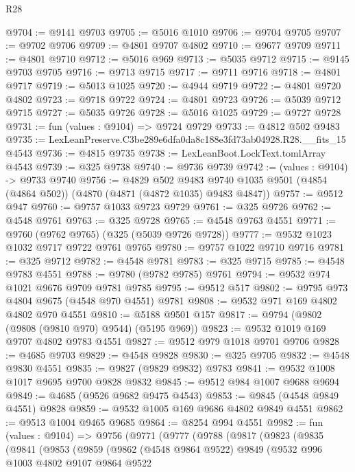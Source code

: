 \begin{lexlean}{R28}
\begin{coremodule}
@9704 := @9141 @9703
@9705 := @5016 @1010
@9706 := @9704 @9705
@9707 := @9702 @9706
@9709 := @4801 @9707 @4802
@9710 := @9677 @9709
@9711 := @4801 @9710
@9712 := @5016 @969
@9713 := @5035 @9712
@9715 := @9145 @9703 @9705
@9716 := @9713 @9715
@9717 := @9711 @9716
@9718 := @4801 @9717
@9719 := @5013 @1025
@9720 := @4944 @9719
@9722 := @4801 @9720 @4802
@9723 := @9718 @9722
@9724 := @4801 @9723
@9726 := @5039 @9712 @9715
@9727 := @5035 @9726
@9728 := @5016 @1025
@9729 := @9727 @9728
@9731 := fun (values : @9104) => @9724 @9729
@9733 := @4812 @502 @9483
@9735 := LexLeanPreserve.C3be289e6dfa0da8c188e3fd73ab04928.R28.__fits_15 @4543
@9736 := @4815 @9735
@9738 := LexLeanBoot.LockText.tomlArray @4543
@9739 := @325 @9738
@9740 := @9736 @9739
@9742 := (values : @9104) -> @9733 @9740
@9756 := @4829
    @502
    @9483
    @9740
    @1035
    @9501
    (@4854 (@4864 @502))
    (@4870 (@4871 (@4872 @1035) @9483 @4847))
@9757 := @9512 @947
@9760 := @9757 @1033 @9723 @9729
@9761 := @325 @9726
@9762 := @4548 @9761
@9763 := @325 @9728
@9765 := @4548 @9763 @4551
@9771 := @9760 (@9762 @9765) (@325 (@5039 @9726 @9728))
@9777 := @9532 @1023 @1032 @9717 @9722 @9761 @9765
@9780 := @9757 @1022 @9710 @9716
@9781 := @325 @9712
@9782 := @4548 @9781
@9783 := @325 @9715
@9785 := @4548 @9783 @4551
@9788 := @9780 (@9782 @9785) @9761
@9794 := @9532 @974 @1021 @9676 @9709 @9781 @9785
@9795 := @9512 @517
@9802 := @9795 @973 @4804 @9675 (@4548 @970 @4551) @9781
@9808 := @9532 @971 @169 @4802 @4802 @970 @4551
@9810 := @5188 @9501 @157
@9817 := @9794 (@9802 (@9808 (@9810 @970) @9544) (@5195 @969))
@9823 := @9532 @1019 @169 @9707 @4802 @9783 @4551
@9827 := @9512 @979 @1018 @9701 @9706
@9828 := @4685 @9703
@9829 := @4548 @9828
@9830 := @325 @9705
@9832 := @4548 @9830 @4551
@9835 := @9827 (@9829 @9832) @9783
@9841 := @9532 @1008 @1017 @9695 @9700 @9828 @9832
@9845 := @9512 @984 @1007 @9688 @9694
@9849 := @4685 (@9526 @9682 @9475 @4543)
@9853 := @9845 (@4548 @9849 @4551) @9828
@9859 := @9532 @1005 @169 @9686 @4802 @9849 @4551
@9862 := @9513 @1004 @9465 @9685
@9864 := @8254 @994 @4551
@9982 := fun (values : @9104) =>
  @9756
    (@9771
      (@9777
        (@9788
          (@9817
            (@9823
              (@9835
                (@9841
                  (@9853
                    (@9859
                      (@9862
                        (@4548 @9864 @9522)
                        @9849
                        (@9532
                          @996
                          @1003
                          @4802
                          @9107
                          @9864
                          @9522

\end{coremodule}
\end{lexlean}
